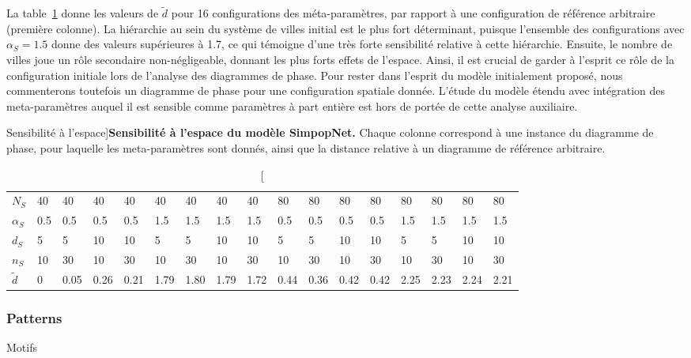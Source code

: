 La table~\ref{tab:macrocoevolexplo:spacematters} donne les valeurs de $\tilde{d}$ pour 16 configurations des méta-paramètres, par rapport à une configuration de référence arbitraire (première colonne). La hiérarchie au sein du système de villes initial est le plus fort déterminant, puisque l'ensemble des configurations avec $\alpha_S = 1.5$ donne des valeurs supérieures à 1.7, ce qui témoigne d'une très forte sensibilité relative à cette hiérarchie. Ensuite, le nombre de villes joue un rôle secondaire non-négligeable, donnant les plus forts effets de l'espace. Ainsi, il est crucial de garder à l'esprit ce rôle de la configuration initiale lors de l'analyse des diagrammes de phase. Pour rester dans l'esprit du modèle initialement proposé, nous commenterons toutefois un diagramme de phase pour une configuration spatiale donnée. L'étude du modèle étendu avec intégration des meta-paramètres auquel il est sensible comme paramètres à part entière est hors de portée de cette analyse auxiliaire.


\begin{table}[!ht]
\caption[Sensibility to space][Sensibilité à l'espace]{}{\textbf{Sensibilité à l'espace du modèle SimpopNet.} Chaque colonne correspond à une instance du diagramme de phase, pour laquelle les meta-paramètres sont donnés, ainsi que la distance relative à un diagramme de référence arbitraire.\label{tab:macrocoevolexplo:spacematters}}
\begin{tabular}{|l|l|l|l|l|l|l|l|l|l|l|l|l|l|l|l|l|}
\hline
$N_S$ & 40 & 40 & 40 & 40 & 40 & 40 & 40 & 40 & 80 & 80 & 80 & 80 & 80 & 80 & 80 & 80\\
$\alpha_S$ & 0.5 & 0.5 & 0.5 & 0.5 & 1.5 & 1.5 & 1.5 & 1.5 & 0.5 & 0.5 & 0.5 & 0.5 & 1.5 & 1.5 & 1.5 & 1.5\\
$d_S$ & 5 & 5 & 10 & 10 & 5 & 5 & 10 & 10 & 5 & 5 & 10 & 10 & 5 & 5 & 10 & 10\\
$n_S$ & 10 & 30 & 10 & 30 & 10 & 30 & 10 & 30 & 10 & 30 & 10 & 30 & 10 & 30 & 10 & 30\\
$\tilde{d}$ & 0 & 0.05 & 0.26 & 0.21 & 1.79 & 1.80 & 1.79 & 1.72 & 0.44 & 0.36 & 0.42 & 0.42 & 2.25 & 2.23 & 2.24 & 2.21\\\hline
\end{tabular}
\end{table}



\subsubsection{Patterns}{Motifs}


